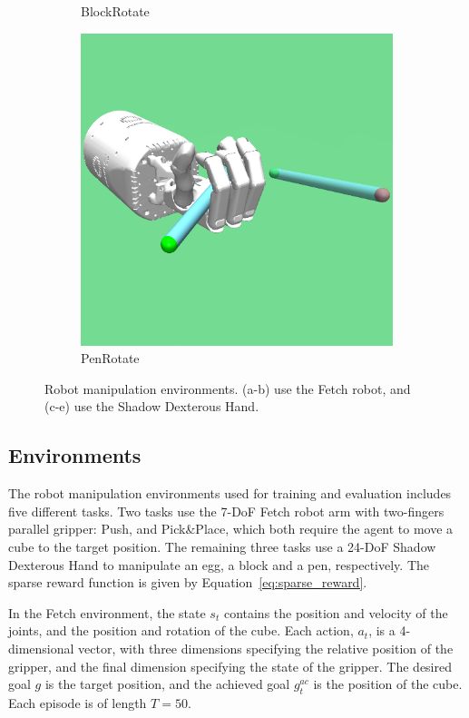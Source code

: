 \begin{figure}
\begin{subfigure}[t]{0.19\textwidth}
    \caption{BlockRotate}
    \label{subfig:env_handblock}
  \end{subfigure}\hfill
  \begin{subfigure}[t]{0.19\textwidth}
    \includegraphics[width=\textwidth]{figures/chapter4/handpen_resize.png}
    \caption{PenRotate}
    \label{subfig:env_handpen}
  \end{subfigure}\hfill
  \caption{Robot manipulation environments. (a-b) use the Fetch robot, and (c-e) use the Shadow Dexterous Hand.} 
  \label{fig:env_c4}
\end{figure}

\subsection{Environments}
The robot manipulation environments used for training and evaluation includes five different tasks. Two tasks use the 7-DoF Fetch robot arm with two-fingers parallel gripper: Push, and Pick\&Place, which both require the agent to move a cube to the target position. The remaining three tasks use a 24-DoF Shadow Dexterous Hand to manipulate an egg, a block and a pen, respectively. The sparse reward function is given by Equation~\eqref{eq:sparse_reward}.

In the Fetch environment, the state $s_{t}$ contains the position and velocity of the joints, and the position and rotation of the cube. Each action, $a_{t}$, is a 4-dimensional vector, with three dimensions specifying the relative position of the gripper, and the final dimension specifying the state of the gripper. The desired goal $g$ is the target position, and the achieved goal $g^{ac}_{t}$ is the position of the cube. Each episode is of length $T = 50$.

